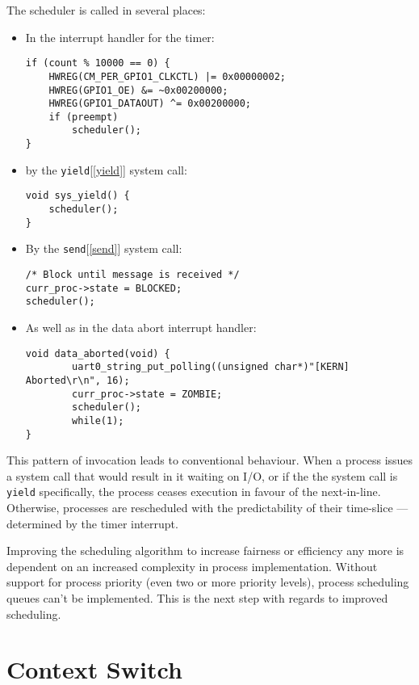 \documentclass[12pt]{article}
\newcommand{\code}[1]{\colorbox{codegray}{\texttt{\footnotesize{#1}}}}
\begin{document}
The scheduler is called in several places:
\begin{itemize}
	\item In the interrupt handler for the timer:
	      \begin{lstlisting}[caption={src/timer.c}]
if (count % 10000 == 0) { 
	HWREG(CM_PER_GPIO1_CLKCTL) |= 0x00000002;
	HWREG(GPIO1_OE) &= ~0x00200000;
	HWREG(GPIO1_DATAOUT) ^= 0x00200000;
	if (preempt)
		scheduler();
}
\end{lstlisting}
	\item by the \code{yield}[\ref{yield}] system call:
	      \begin{lstlisting}[caption={src/syscalls/yield.c}]
void sys_yield() {
	scheduler();
}
\end{lstlisting}
	\item By the \code{send}[\ref{send}] system call:
	      \begin{lstlisting}[caption={src/syscalls/send.c}]
/* Block until message is received */
curr_proc->state = BLOCKED;
scheduler();
\end{lstlisting}
	\item As well as in the data abort interrupt handler:
	      \begin{lstlisting}[caption={src/interrupt.c}]
void data_aborted(void) {
		uart0_string_put_polling((unsigned char*)"[KERN] Aborted\r\n", 16);
		curr_proc->state = ZOMBIE;
		scheduler();
		while(1);
}
\end{lstlisting}

\end{itemize}

This pattern of invocation leads to conventional behaviour.
When a process issues a system call that would result in it
waiting on I/O, or if the the system call is \code{yield}
specifically, the process ceases execution in favour of the
next-in-line.  Otherwise, processes are rescheduled with the
predictability of their time-slice --- determined by the timer
interrupt.

Improving the scheduling algorithm to increase fairness or
efficiency any more is dependent on an increased complexity in
process implementation.  Without support for process priority (even
two or more priority levels), process scheduling queues can't be
implemented.  This is the next step with regards to improved
scheduling.

\section{Context Switch}\label{context_switch}
\end{document}
